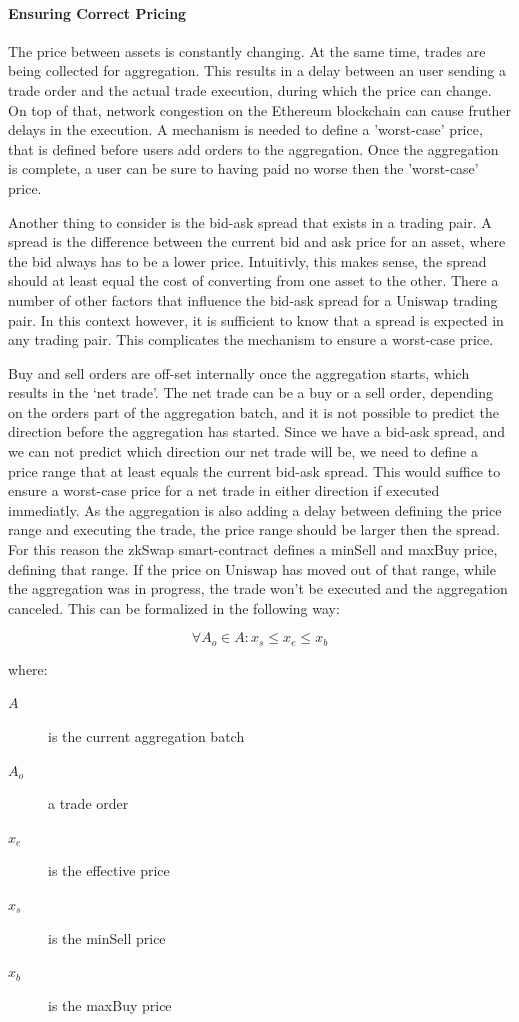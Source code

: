 \documentclass[../../thesis.tex]{subfiles}
\begin{document}
\paragraph{Ensuring Correct Pricing}
The price between assets is constantly changing. At the same time, trades are being collected for aggregation. This results in a delay between an user sending a trade order and the actual trade execution, during which the price can change. On top of that, network congestion on the Ethereum blockchain can cause fruther delays in the execution. A mechanism is needed to define a 'worst-case' price, that is defined before users add orders to the aggregation. Once the aggregation is complete, a user can be sure to having paid no worse then the 'worst-case' price.

Another thing to consider is the bid-ask spread that exists in a trading pair. A spread is the difference between the current bid and ask price for an asset, where the bid always has to be a lower price. Intuitivly, this makes sense, the spread should at least equal the cost of converting from one asset to the other. There a number of other factors that influence the bid-ask spread for a Uniswap trading pair. In this context however, it is sufficient to know that a spread is expected in any trading pair. This complicates the mechanism to ensure a worst-case price. 

Buy and sell orders are off-set internally once the aggregation starts, which results in the `net trade'. The net trade can be a buy or a sell order, depending on the orders part of the aggregation batch, and it is not possible to predict the direction before the aggregation has started. Since we have a bid-ask spread, and we can not predict which direction our net trade will be, we need to define a price range that at least equals the current bid-ask spread. This would suffice to ensure a worst-case price for a net trade in either direction if executed immediatly.
As the aggregation is also adding a delay between defining the price range and executing the trade, the price range should be larger then the spread. For this reason the zkSwap smart-contract defines a minSell and maxBuy price, defining that range. If the price on Uniswap has moved out of that range, while the aggregation was in progress, the trade won't be executed and the aggregation canceled. This can be formalized in the following way: 

$$\forall A_o\in A: x_s \leq x_e \leq x_b$$


where:
\begin{description}
\item[$A$] is the current aggregation batch
\item[$A_o$] a trade order
\item[$x_e$] is the effective price 
\item[$x_s$] is the minSell price
\item[$x_b$] is the maxBuy price 
\end{description}
\end{document}
